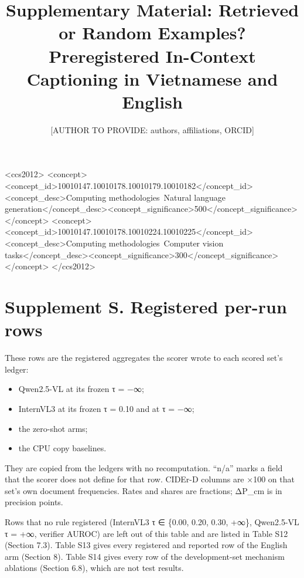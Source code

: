 \documentclass[manuscript,screen]{acmart}
\providecommand{\tightlist}{\setlength{\itemsep}{0pt}\setlength{\parskip}{0pt}}
\begin{document}
\title{Supplementary Material: Retrieved or Random Examples? Preregistered In-Context Captioning in Vietnamese and English}
\author{[AUTHOR TO PROVIDE: authors, affiliations, ORCID]}

\begin{CCSXML}
<ccs2012>
<concept><concept_id>10010147.10010178.10010179.10010182</concept_id><concept_desc>Computing methodologies~Natural language generation</concept_desc><concept_significance>500</concept_significance></concept>
<concept><concept_id>10010147.10010178.10010224.10010225</concept_id><concept_desc>Computing methodologies~Computer vision tasks</concept_desc><concept_significance>300</concept_significance></concept>
</ccs2012>
\end{CCSXML}
\maketitle
\setcounter{secnumdepth}{0}\footnotesize\setlength{\tabcolsep}{3pt}
\section{Supplement S. Registered per-run rows}\label{supplement-s.-registered-per-run-rows}

These rows are the registered aggregates the scorer wrote to each scored set's ledger:

\begin{itemize}
\tightlist
\item
  Qwen2.5-VL at its frozen τ = −∞;
\item
  InternVL3 at its frozen τ = 0.10 and at τ = −∞;
\item
  the zero-shot arms;
\item
  the CPU copy baselines.
\end{itemize}

They are copied from the ledgers with no recomputation. ``n/a'' marks a field that the scorer does
not define for that row. CIDEr-D columns are ×100 on that set's own document frequencies. Rates and
shares are fractions; ΔP\_cm is in precision points.

Rows that no rule registered (InternVL3 τ ∈ \{0.00, 0.20, 0.30, +∞\}, Qwen2.5-VL τ = +∞, verifier
AUROC) are left out of this table and are listed in Table S12 (Section 7.3). Table S13 gives every
registered and reported row of the English arm (Section 8). Table S14 gives every row of the
development-set mechanism ablations (Section 6.8), which are not test results.
\end{document}

